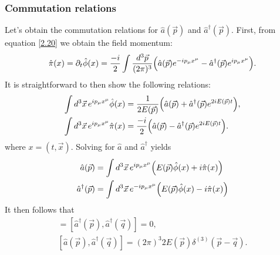 \documentclass{article}
\begin{document}
\subsubsection{Commutation relations}
Let's obtain the commutation relations for $ \hat{a}(\vec{p}) $ and $ \hat{a}^{\dagger}(\vec{p}) $. First, from equation \eqref{2.20} we obtain the field momentum:
\begin{equation} \label{2.22}
	\hat{\pi}(x) = \partial_{t} \hat{\phi}(x) = \frac{-i}{2} \int \frac{\dd[3]{\vec{p}}}{(2\pi)^{3}} \qty( \hat{a}(\vec{p}) e^{-ip_{\mu} x^{\mu}} - \hat{a}^{\dagger}(\vec{p}) e^{ip_{\mu} x^{\mu}} ).
\end{equation}
It is straightforward to then show the following relations:
\begin{align}
	\int \dd[3]{\vec{x}} e^{ip_{\mu} x^{\mu}} \hat{\phi}(x) &= \frac{1}{2E(\vec{p})} \qty(\hat{a}(\vec{p}) + \hat{a}^{\dagger}(\vec{p}) e^{2iE(\vec{p})t}), \\
	\int \dd[3]{\vec{x}} e^{ip_{\mu} x^{\mu}} \hat{\pi}(x) &= \frac{-i}{2} \qty( \hat{a}(\vec{p}) - \hat{a}^{\dagger}(\vec{p}) e^{2iE(\vec{p})t} ).
\end{align}
where $ x = (t,\vec{x}) $. Solving for $ \hat{a} $ and $ \hat{a}^{\dagger} $ yields
\begin{align}
	\hat{a}(\vec{p}) &= \int \dd[3]{\vec{x}} e^{ip_{\mu} x^{\mu}} \qty(E(\vec{p})\hat{\phi}(x) + i \hat{\pi}(x)) \\
	\hat{a}^{\dagger}(\vec{p}) &= \int \dd[3]{\vec{x}} e^{-ip_{\mu} x^{\mu}} \qty(E(\vec{p}) \hat{\phi}(x) - i \hat{\pi}(x))
\end{align}
It then follows that
\begin{gather}
	[\hat{a}(\vec{p}), \hat{a}(\vec{q})] = [\hat{a}^{\dagger}(\vec{p}), \hat{a}^{\dagger}(\vec{q})] = 0, \\ [\hat{a}(\vec{p}), \hat{a}^{\dagger}(\vec{q})] = (2\pi)^{3} 2E(\vec{p}) \delta^{(3)} (\vec{p} - \vec{q}).
\end{gather}
\end{document}
